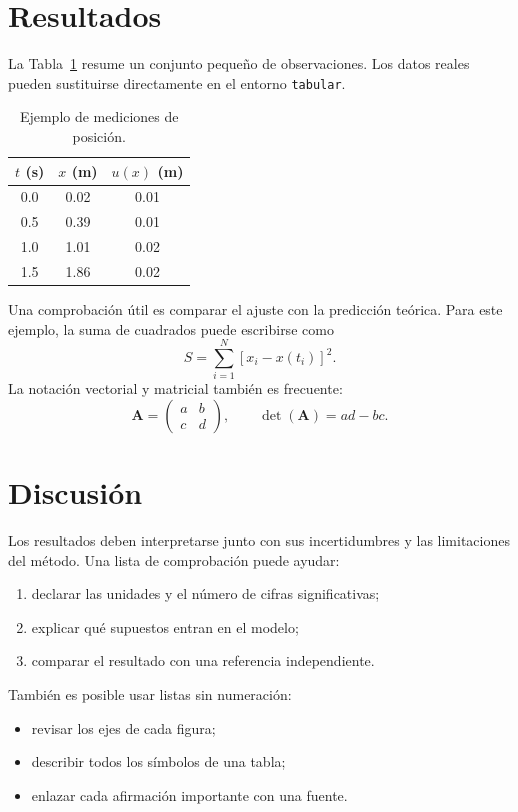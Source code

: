 \documentclass[a4paper,11pt]{article}
\begin{document}
\section{Resultados}
La Tabla~\ref{tab:mediciones} resume un conjunto pequeño de observaciones.
Los datos reales pueden sustituirse directamente en el entorno \verb|tabular|.
\begin{table}[ht]
  \centering
  \caption{Ejemplo de mediciones de posición.}
  \label{tab:mediciones}
  \begin{tabular}{@{}ccc@{}}
    \toprule
    $t$ (s) & $x$ (m) & $u(x)$ (m) \\
    \midrule
    0.0 & 0.02 & 0.01 \\
    0.5 & 0.39 & 0.01 \\
    1.0 & 1.01 & 0.02 \\
    1.5 & 1.86 & 0.02 \\
    \bottomrule
  \end{tabular}
\end{table}

Una comprobación útil es comparar el ajuste con la predicción teórica. Para
este ejemplo, la suma de cuadrados puede escribirse como
\begin{equation}
  S=\sum_{i=1}^{N}\left[x_i-x(t_i)\right]^2.
  \label{eq:minimos}
\end{equation}
La notación vectorial y matricial también es frecuente:
\[
  \mathbf{A}=\begin{pmatrix}a&b\\c&d\end{pmatrix},\qquad
  \det(\mathbf{A})=ad-bc.
\]

\section{Discusión}
Los resultados deben interpretarse junto con sus incertidumbres y las
limitaciones del método. Una lista de comprobación puede ayudar:
\begin{enumerate}
  \item declarar las unidades y el número de cifras significativas;
  \item explicar qué supuestos entran en el modelo;
  \item comparar el resultado con una referencia independiente.
\end{enumerate}
También es posible usar listas sin numeración:
\begin{itemize}
  \item revisar los ejes de cada figura;
  \item describir todos los símbolos de una tabla;
  \item enlazar cada afirmación importante con una fuente.
\end{itemize}
\end{document}

